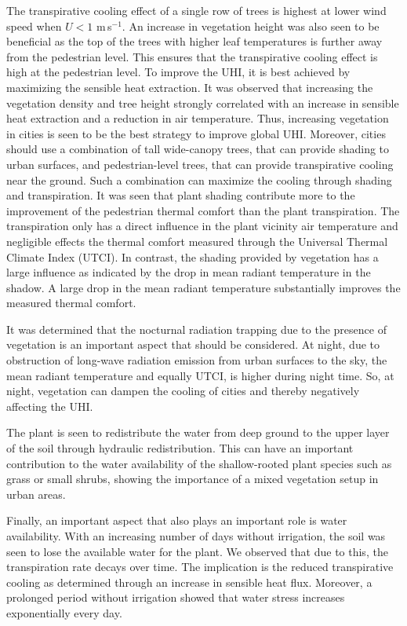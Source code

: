 The transpirative cooling effect of a single row of trees is highest at lower wind speed when $U<1$ m\,s$^{-1}$. An increase in vegetation height was also seen to be beneficial as the top of the trees with higher leaf temperatures is further away from the pedestrian level. This ensures that the transpirative cooling effect is high at the pedestrian level. To improve the UHI, it is best achieved by maximizing the sensible heat extraction. It was observed that increasing the vegetation density and tree height strongly correlated with an increase in sensible heat extraction and a reduction in air temperature. Thus, increasing vegetation in cities is seen to be the best strategy to improve global UHI. Moreover, cities should use a combination of tall wide-canopy trees, that can provide shading to urban surfaces, and pedestrian-level trees, that can provide transpirative cooling near the ground. Such a combination can maximize the cooling through shading and transpiration. It was seen that plant shading contribute more to the improvement of the pedestrian thermal comfort than the plant transpiration. The transpiration only has a direct influence in the plant vicinity air temperature and negligible effects the thermal comfort measured through the Universal Thermal Climate Index (UTCI). In contrast, the shading provided by vegetation has a large influence as indicated by the drop in mean radiant temperature in the shadow. A large drop in the mean radiant temperature substantially improves the measured thermal comfort. 

It was determined that the nocturnal radiation trapping due to the presence of vegetation is an important aspect that should be considered. At night, due to obstruction of long-wave radiation emission from urban surfaces to the sky, the mean radiant temperature and equally UTCI, is higher during night time. So, at night, vegetation can dampen the cooling of cities and thereby negatively affecting the UHI.

The plant is seen to redistribute the water from deep ground to the upper layer of the soil through hydraulic redistribution. This can have an important contribution to the water availability of the shallow-rooted plant species such as grass or small shrubs, showing the importance of a mixed vegetation setup in urban areas. 

Finally, an important aspect that also plays an important role is water availability. With an increasing number of days without irrigation, the soil was seen to lose the available water for the plant. We observed that due to this, the transpiration rate decays over time. The implication is the reduced transpirative cooling as determined through an increase in sensible heat flux. Moreover, a prolonged period without irrigation showed that water stress increases exponentially every day.  



